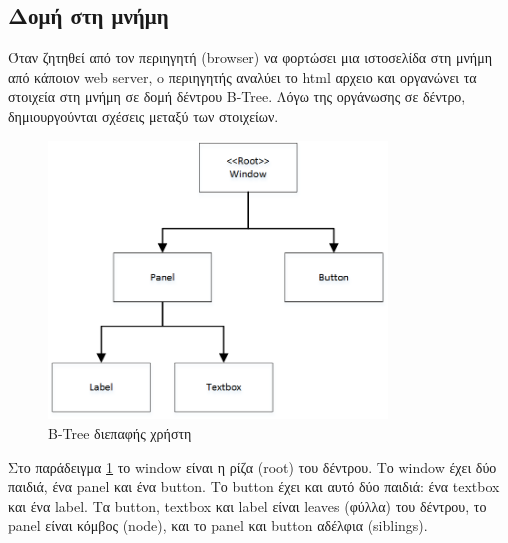 \subsection{Δομή στη μνήμη}	
Όταν ζητηθεί από τον περιηγητή (browser) να φορτώσει μια ιστοσελίδα στη μνήμη από κάποιον web server, o περιηγητής αναλύει το html αρχειο και οργανώνει τα στοιχεία στη μνήμη σε δομή δέντρου \gls{B-Tree}. Λόγω της οργάνωσης σε δέντρο, δημιουργούνται σχέσεις μεταξύ των στοιχείων.

	\begin{figure}[h!]
		\centering
		\includegraphics[width=90mm]{Images/ui_btree}
		\caption{B-Tree διεπαφής χρήστη}
		\label{fig:ui_b-tree}
	\end{figure}
	
Στο παράδειγμα \ref{fig:ui_b-tree}  το window είναι η ρίζα (root) του δέντρου. Το window έχει δύο παιδιά, ένα panel και ένα button. Το button έχει και αυτό δύο παιδιά: ένα textbox και ένα label. Τα button, textbox και label είναι leaves (φύλλα) του δέντρου, το panel είναι κόμβος (node), και το panel και button αδέλφια (siblings).

